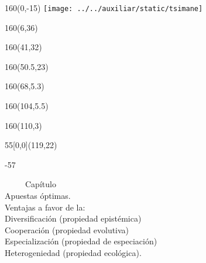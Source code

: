 \documentclass[shownotes,aspectratio=169]{beamer}
\newcounter{capitulo}
\newcommand{\unidad}{\thecapitulo \stepcounter{capitulo}}
\begin{document}
\begin{frame}

\begin{textblock}{160}(0,-15)
\texttt{[image: ../../auxiliar/static/tsimane]}
\end{textblock}


\begin{textblock}{160}(6,36)
\LARGE {}
\end{textblock}
\begin{textblock}{160}(41,32)
\LARGE {}
\end{textblock}
\begin{textblock}{160}(50.5,23)
\LARGE {}
\end{textblock}
\begin{textblock}{160}(68,5.3)
\LARGE {}
\end{textblock}
\begin{textblock}{160}(104,5.5)
\LARGE {}
\end{textblock}
\begin{textblock}{160}(110,3)
\LARGE {}
\end{textblock}


\begin{textblock}{55}[0,0](119,22)
\begin{turn}{-57}
\parbox{7cm}{\sloppy\setlength\parfillskip{0pt}
\textcolor{black!0}{\ \ \ \ \ Capítulo \unidad} \\
\small\textcolor{black!5}{\hspace{-0.15cm} Apuestas óptimas.} \\
\small\textcolor{black!5}{\hspace{-0.85cm} Ventajas a favor de la:} \\
\small\textcolor{black!5}{\hspace{-1.45cm} Diversificación (propiedad epistémica)}\\
\small\textcolor{black!5}{\hspace{-1.7cm} Cooperación (propiedad evolutiva)}\\
\small\textcolor{black!5}{ \hspace{-1.75cm}Especialización (propiedad de especiación)} \\
\small\textcolor{black!5}{\hspace{-2cm} Heterogeniedad (propiedad ecológica).\\ }}
\end{turn}
\end{textblock}



\end{frame}
\end{document}
